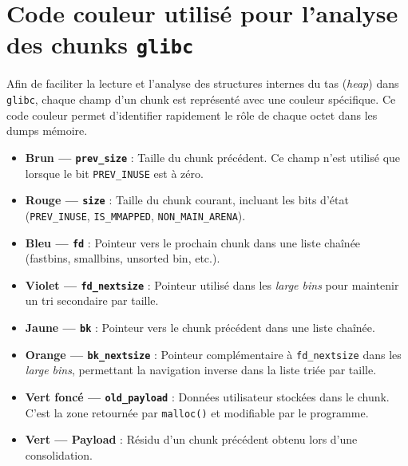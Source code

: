 \section*{Code couleur utilisé pour l'analyse des chunks \texttt{glibc}}

Afin de faciliter la lecture et l'analyse des structures internes du tas
(\textit{heap}) dans \texttt{glibc}, chaque champ d'un chunk est représenté
avec une couleur spécifique.
Ce code couleur permet d'identifier rapidement le rôle de chaque octet
dans les dumps mémoire.

\begin{itemize}
      \item \textcolor{pwndbgbrown}{\textbf{Brun — \texttt{prev\_size}}} :
            Taille du chunk précédent. Ce champ n'est utilisé que lorsque le bit
            \texttt{PREV\_INUSE} est à zéro.

      \item \textcolor{pwndbgred}{\textbf{Rouge — \texttt{size}}} :
            Taille du chunk courant, incluant les bits d'état
            (\texttt{PREV\_INUSE}, \texttt{IS\_MMAPPED}, \texttt{NON\_MAIN\_ARENA}).

      \item \textcolor{pwndbgblue}{\textbf{Bleu — \texttt{fd}}} :
            Pointeur vers le prochain chunk dans une liste chaînée
            (fastbins, smallbins, unsorted bin, etc.).

      \item \textcolor{pwndbgpurple}{\textbf{Violet — \texttt{fd\_nextsize}}} :
            Pointeur utilisé dans les \textit{large bins} pour maintenir un tri
            secondaire par taille.

      \item \textcolor{pwndbgyellow}{\textbf{Jaune — \texttt{bk}}} :
            Pointeur vers le chunk précédent dans une liste chaînée.

      \item \textcolor{pwndbgorange}{\textbf{Orange — \texttt{bk\_nextsize}}} :
            Pointeur complémentaire à \texttt{fd\_nextsize} dans les \textit{large bins},
            permettant la navigation inverse dans la liste triée par taille.

      \item \textcolor{pwndbgdarkgreen}{\textbf{Vert foncé — \texttt{old\_payload}}} :
            Données utilisateur stockées dans le chunk.
            C'est la zone retournée par \texttt{malloc()} et modifiable par le programme.

      \item \textcolor{pwndbggreen}{\textbf{Vert — Payload}} :
            Résidu d'un chunk précédent obtenu lors d'une consolidation.

\end{itemize}

